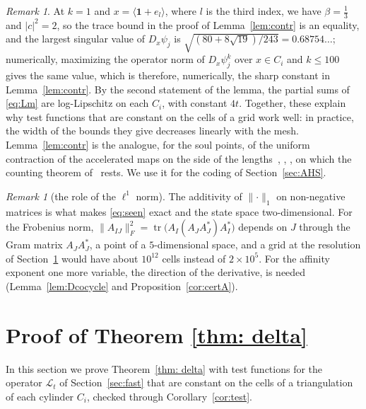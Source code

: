 \documentclass[11pt]{amsart}
\theoremstyle{definition}
\theoremstyle{remark}
\newtheorem{remark}[proposition]{Remark}
\newcommand{\one}{\mathbf 1}
\newcommand{\cL}{\mathcal L}
\newcommand{\abs}[1]{\lvert #1\rvert}
\newcommand{\norm}[1]{\lVert #1\rVert}
\newcommand{\pr}[1]{\langle #1\rangle}
\begin{document}
\begin{remark}\label{rem:contr}
At $k=1$ and $x=\pr{\one+e_l}$, where $l$ is the third index, we have $\beta=\frac13$ and $\abs c^2=2$, so the trace bound in the proof of Lemma~\ref{lem:contr} is an equality, and the largest singular value of $D_x\psi_j$ is $\sqrt{(80+8\sqrt{19})/243}=0.68754\ldots$; numerically, maximizing the operator norm of $D_x\psi_j^k$ over $x\in C_i$ and $k\le100$ gives the same value, which is therefore, numerically, the sharp constant in Lemma~\ref{lem:contr}. 
By the second statement of the lemma, the partial sums of \eqref{eq:Lm} are log-Lipschitz on each $C_i$, with constant $4t$. 
Together, these explain why test functions that are constant on the cells of a grid work well: in practice, the width of the bounds they give decreases linearly with the mesh.
Lemma~\ref{lem:contr} is the analogue, for the soul points, of the uniform contraction of the accelerated maps on the side of the lengths~\cite[Lemma~2]{AS13}, \cite[Lemma~13]{AHS16}, \cite[Prop.~45]{GMR19}, on which the counting theorem of~\cite{GMR19} rests.
We use it for the coding of Section~\ref{sec:AHS}.
\end{remark}

\begin{remark}[the role of the $\ell^1$ norm]\label{rem:l1}
The additivity of $\norm{\cdot}_1$ on non-negative matrices is what makes \eqref{eq:seen} exact and the state space two-dimensional. For the Frobenius norm, $\norm{A_{IJ}}_F^2=\operatorname{tr}\bigl(A_I(A_JA_J^*)A_I^*\bigr)$ depends on $J$ through the Gram matrix $A_JA_J^*$, a point of a $5$-dimensional space, and a grid at the resolution of Section~\ref{sec:thmB} would have about $10^{12}$ cells instead of $2\times10^5$. For the affinity exponent one more variable, the direction of the derivative, is needed (Lemma~\ref{lem:Dcocycle} and Proposition~\ref{cor:certA}).
\end{remark}

\section{Proof of Theorem \ref{thm: delta} }\label{sec:thmB}

In this section we prove Theorem~\ref{thm: delta} with test functions for the operator $\cL_t$ of Section~\ref{sec:fast} that are constant on the cells of a triangulation of each cylinder $C_i$, checked through Corollary~\ref{cor:test}.

\thmdelta*
\end{document}

